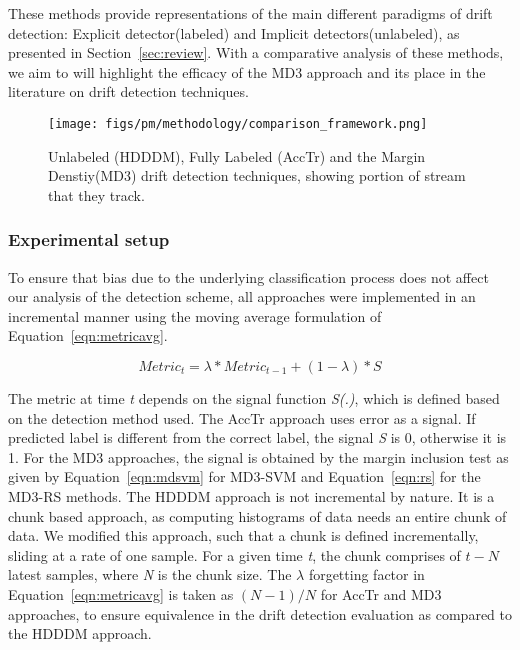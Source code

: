 \documentclass[authoryear,3p,times,twocolumn]{elsarticle}
\begin{document}
These methods provide representations of the main different paradigms of drift detection: Explicit detector(labeled) and Implicit detectors(unlabeled), as presented in Section~\ref{sec:review}. With a comparative analysis of these methods, we aim to will highlight the efficacy of the MD3 approach and its place in the literature on drift detection techniques. 

\begin{figure}[t]
  \centering
  \texttt{[image: figs/pm/methodology/comparison\_framework.png]}
   \caption{Unlabeled (HDDDM), Fully Labeled (AccTr) and the Margin Denstiy(MD3) drift detection techniques, showing portion of stream that they track.}
  \label{fig:comparison}
\end{figure}

\subsubsection{Experimental setup}
\label{sec:setup}

To ensure that bias due to the underlying classification process does not affect our analysis of the detection scheme, all approaches were implemented in an incremental manner using the moving average formulation of Equation~\ref{eqn:metricavg}. 

\begin{equation}
\label{eqn:metricavg}
Metric_t = \lambda*Metric_{t-1} +(1-\lambda)*S
\end{equation}

The metric at time \textit{t} depends on the signal function \textit{S(.)}, which is defined based on the detection method used. The AccTr approach uses error as a signal. If predicted label is different from the correct label, the signal \textit{S} is 0, otherwise it is 1. For the MD3 approaches, the signal is obtained by the margin inclusion test as given by Equation~\ref{eqn:mdsvm} for MD3-SVM and Equation~\ref{eqn:rs} for the MD3-RS methods. The HDDDM approach is not incremental by nature. It is a chunk based approach, as computing histograms of data needs an entire chunk of data. We modified this approach, such that a chunk is defined incrementally, sliding at a rate of one sample. For a given time \textit{t}, the chunk comprises of $t-N$ latest samples, where \textit{N} is the chunk size. The $\lambda$ forgetting factor in Equation~\ref{eqn:metricavg} is taken as $(N-1)/N$ for AccTr and MD3 approaches, to ensure equivalence in the drift detection evaluation as compared to the HDDDM approach. 
\end{document}
